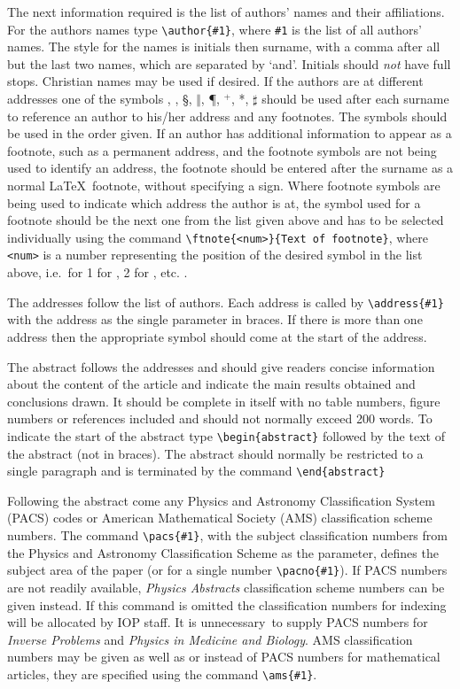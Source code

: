 The next information required is the list of authors' names and their
affiliations. For the authors names type \verb"\author{#1}",
where \verb"#1" is the
list of all authors' names. The style for the names is initials then
surname, with a comma after all but the last
two names, which are separated by `and'. Initials should {\it not} have
full stops. Christian names may be used if
desired. If the authors are at different addresses one of the symbols
\dag, \ddag, \S, $\Vert$, \P, $^+$, *, $\sharp$ should be used after each
surname to reference an author to his/her address
and any footnotes. The symbols should be used in the order given.  If
an author has additional information to appear as a footnote, such as
a permanent address, and the
footnote symbols are not being used to identify an address,
the footnote should be entered after the surname
as a normal \LaTeX\ footnote, without
specifying a sign. Where footnote symbols are being used to indicate
which address the author is at, the
symbol used for a footnote should be the next one from the list given above
and has to be selected individually using the command
\verb"\ftnote{<num>}{Text of footnote}", where \verb"<num>" is a
number representing the position of the desired symbol in the list above,
i.e.\ for 1 for \dag, 2 for \ddag, etc.
.

The addresses follow the list of authors. Each address is called by
\verb"\address{#1}" with the address as the single parameter in braces.
If there is more
than one address then the appropriate symbol should come at the start of
the address.

The abstract follows the addresses and
should give readers concise information about the content
of the article and indicate the main results obtained and conclusions
drawn. It should be complete in itself with no table numbers, figure
numbers or references included and should not normally exceed 200
words.
To indicate the start
of the abstract type \verb"\begin{abstract}" followed by the text of the
abstract (not in braces).  The abstract should normally be restricted
to a single paragraph and is terminated by the command
\verb"\end{abstract}"

Following the abstract come any
Physics and Astronomy Classification System (PACS) codes
or American Mathematical Society
(AMS) classification scheme numbers.
The command
\verb"\pacs{#1}", with the subject classification numbers from the
Physics and Astronomy Classification Scheme as the parameter, defines
the subject area of the paper (or for a single number \verb"\pacno{#1}").
If PACS numbers are not readily
available, {\it Physics Abstracts\/} classification scheme numbers can be
given instead. If this command  is omitted the
classification numbers for indexing
will be allocated by IOP staff. It is
unnecessary~to supply PACS numbers for {\it Inverse
Problems} and {\it Physics in Medicine and Biology}.
AMS classification numbers may be given as well as or instead of PACS
numbers for mathematical articles, they are specified using the
command \verb"\ams{#1}".

